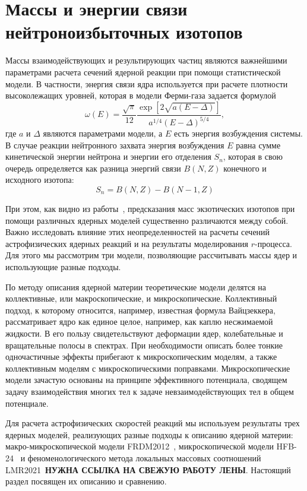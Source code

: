 \section{Массы и энергии связи нейтроноизбыточных изотопов} \label{massmodel}
Массы взаимодействующих и результирующих частиц являются важнейшими параметрами расчета сечений ядерной реакции при помощи статистической модели. В частности, энергия связи ядра используется при расчете плотности высоколежащих уровней, которая в модели Ферми-газа задается формулой
\begin{equation} \displaystyle
  \omega(E) = \frac{\sqrt{\pi}}{12} 
  \frac{\exp [ 2\sqrt{a(E-\Delta)} ] }
       {a^{1/4}(E-\Delta)^{5/4}},
\end{equation}
где $a$ и $\Delta$ являются параметрами модели, а $E$ есть энергия возбуждения системы. В случае реакции нейтронного захвата энергия возбуждения $E$ равна сумме кинетической энергии нейтрона и энергии его отделения $S_n$, которая в свою очередь определяется как разница энергий связи $B(N,Z)$ конечного и исходного изотопа:
\begin{equation}
S_n = B(N, Z) - B(N - 1, Z)
\end{equation}

При этом, как видно из работы~\cite{sobiczewski2018}, предсказания масс экзотических изотопов при помощи различных ядерных моделей существенно различаются между собой. Важно исследовать влияние этих неопределенностей на расчеты сечений астрофизических ядерных реакций и на результаты моделирования $r$-процесса. Для этого мы рассмотрим три модели, позволяющие рассчитывать массы ядер и использующие разные подходы.

По методу описания ядерной материи теоретические модели делятся на коллективные, или макроскопические, и микроскопические. Коллективный подход, к которому относится, например, известная формула Вайцзеккера, рассматривает ядро как единое целое, например, как каплю несжимаемой жидкости. В его пользу свидетельствуют деформации ядер, колебательные и вращательные полосы в спектрах. При необходимости описать более тонкие одночастичные эффекты прибегают к микроскопическим моделям, а также коллективным моделям с микроскопическими поправками. Микроскопические модели зачастую основаны на принципе эффективного потенциала, сводящем задачу взаимодействия многих тел к задаче невзаимодействующих тел в общем потенциале.

Для расчета астрофизических скоростей реакций мы используем результаты трех ядерных моделей, реализующих разные подходы к описанию ядерной материи: макро-микроскопической модели FRDM2012~\cite{moller2016}, микроскопической модели HFB-24~\cite{goriely2013} и феноменологического метода локальных массовых соотношений LMR2021~\textbf{НУЖНА ССЫЛКА НА СВЕЖУЮ РАБОТУ ЛЕНЫ}. Настоящий раздел посвящен их описанию и сравнению.
